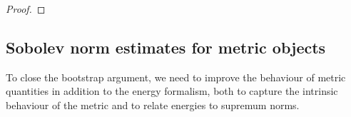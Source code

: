 \documentclass[11pt,leqno,textwidth=10cm]{amsart}
\numberwithin{equation}{section}
\theoremstyle{definition}
\theoremstyle{plain}
\newcommand{\1}{\mathbbm{1}}
\newcommand{\E}{\mathcal{E}}
\newcommand{\Ric}{\text{\normalfont{Ric}}}
\renewcommand{\epsilon}{\varepsilon}
\begin{document}
\begin{proof}
\end{proof}

\subsection{Sobolev norm estimates for metric objects}\label{subsec:int-metric}

To close the bootstrap argument, we need to improve the behaviour of metric quantities in addition to the energy formalism, both to capture the intrinsic behaviour of the metric and to relate energies to supremum norms.
\end{document}
